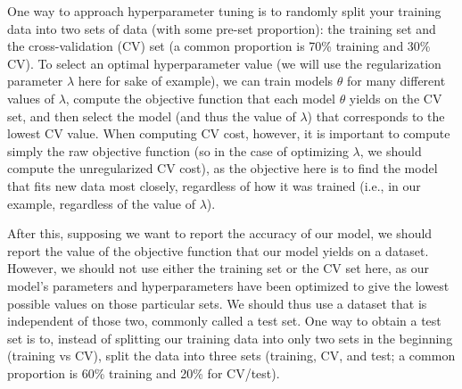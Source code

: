 \documentclass{article}
\begin{document}
One way to approach hyperparameter tuning is to randomly split your training data into two sets of data (with some pre-set proportion): the training set and the cross-validation (CV) set (a common proportion is 70\% training and 30\% CV). To select an optimal hyperparameter value (we will use the regularization parameter $\lambda$ here for sake of example), we can train models $\theta$ for many different values of $\lambda$, compute the objective function that each model $\theta$ yields on the CV set, and then select the model (and thus the value of $\lambda$) that corresponds to the lowest CV value. When computing CV cost, however, it is important to compute simply the raw objective function (so in the case of optimizing $\lambda$, we should compute the unregularized CV cost), as the objective here is to find the model that fits new data most closely, regardless of how it was trained (i.e., in our example, regardless of the value of $\lambda$).

After this, supposing we want to report the accuracy of our model, we should report the value of the objective function that our model yields on a dataset. However, we should not use either the training set or the CV set here, as our model's parameters and hyperparameters have been optimized to give the lowest possible values on those particular sets. We should thus use a dataset that is independent of those two, commonly called a test set. One way to obtain a test set is to, instead of splitting our training data into only two sets in the beginning (training vs CV), split the data into three sets (training, CV, and test; a common proportion is 60\% training and 20\% for CV/test).
\end{document}
